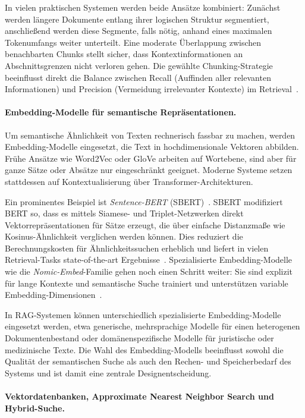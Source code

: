 In vielen praktischen Systemen werden beide Ansätze kombiniert: Zunächst werden längere Dokumente entlang ihrer logischen Struktur segmentiert, anschließend werden diese Segmente, falls nötig, anhand eines maximalen Tokenumfangs weiter unterteilt.
Eine moderate Überlappung zwischen benachbarten Chunks stellt sicher, dass Kontextinformationen an Abschnittsgrenzen nicht verloren gehen.
Die gewählte Chunking-Strategie beeinflusst direkt die Balance zwischen Recall (Auffinden aller relevanten Informationen) und Precision (Vermeidung irrelevanter Kontexte) im Retrieval~\cite{gao2023retrieval}.

\paragraph{Embedding-Modelle für semantische Repräsentationen.}

Um semantische Ähnlichkeit von Texten rechnerisch fassbar zu machen, werden Embedding-Modelle eingesetzt, die Text in hochdimensionale Vektoren abbilden.
Frühe Ansätze wie Word2Vec oder GloVe arbeiten auf Wortebene, sind aber für ganze Sätze oder Absätze nur eingeschränkt geeignet.
Moderne Systeme setzen stattdessen auf Kontextualisierung über Transformer-Architekturen.

Ein prominentes Beispiel ist \textit{Sentence-BERT} (SBERT)~\cite{reimers2019sbert}.
SBERT modifiziert BERT so, dass es mittels Siamese- und Triplet-Netzwerken direkt Vektorrepräsentationen für Sätze erzeugt, die über einfache Distanzmaße wie Kosinus-Ähnlichkeit verglichen werden können.
Dies reduziert die Berechnungskosten für Ähnlichkeitssuchen erheblich und liefert in vielen Retrieval-Tasks state-of-the-art Ergebnisse~\cite{reimers2019sbert}.
Spezialisierte Embedding-Modelle wie die \textit{Nomic-Embed}-Familie gehen noch einen Schritt weiter:
Sie sind explizit für lange Kontexte und semantische Suche trainiert und unterstützen variable Embedding-Dimensionen~\cite{nussbaum2024nomic,kusupati2022matryoshka}.

In RAG-Systemen können unterschiedlich spezialisierte Embedding-Modelle eingesetzt werden, etwa generische, mehrsprachige Modelle für einen heterogenen Dokumentenbestand oder domänenspezifische Modelle für juristische oder medizinische Texte.
Die Wahl des Embedding-Modells beeinflusst sowohl die Qualität der semantischen Suche als auch den Rechen- und Speicherbedarf des Systems und ist damit eine zentrale Designentscheidung.

\paragraph{Vektordatenbanken, Approximate Nearest Neighbor Search und Hybrid-Suche.}

